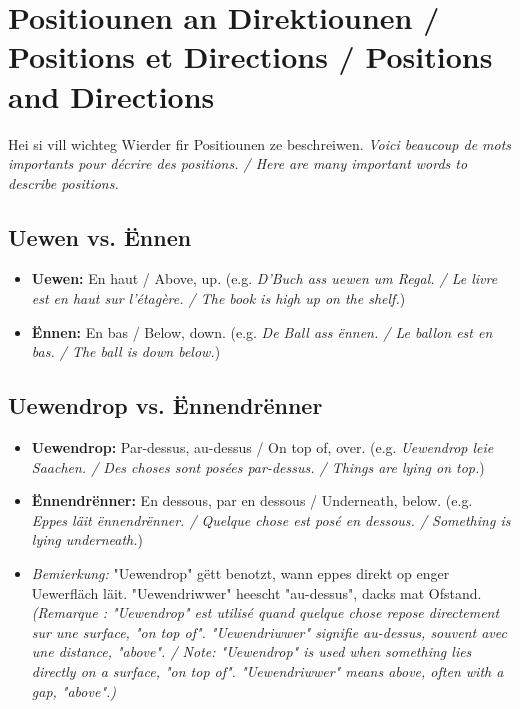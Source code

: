 \vspace{1cm}

\section{Positiounen an Direktiounen / Positions et Directions / Positions and Directions}

Hei si vill wichteg Wierder fir Positiounen ze beschreiwen. \textit{Voici beaucoup de mots importants pour décrire des positions. / Here are many important words to describe positions.}

\subsection*{Uewen vs. Ënnen}
\begin{itemize}
    \item \textbf{Uewen:} En haut / Above, up. (e.g. \textit{D'Buch ass uewen um Regal. / Le livre est en haut sur l'étagère. / The book is high up on the shelf.})
    \item \textbf{Ënnen:} En bas / Below, down. (e.g. \textit{De Ball ass ënnen. / Le ballon est en bas. / The ball is down below.})
\end{itemize}

\subsection*{Uewendrop vs. Ënnendrënner}
\begin{itemize}
    \item \textbf{Uewendrop:} Par-dessus, au-dessus / On top of, over. (e.g. \textit{Uewendrop leie Saachen. / Des choses sont posées par-dessus. / Things are lying on top.})
    \item \textbf{Ënnendrënner:} En dessous, par en dessous / Underneath, below. (e.g. \textit{Eppes läit ënnendrënner. / Quelque chose est posé en dessous. / Something is lying underneath.})
    \item \textit{Bemierkung:} "Uewendrop" gëtt benotzt, wann eppes direkt op enger Uewerfläch läit. "Uewendriwwer" heescht "au-dessus", dacks mat Ofstand. \textit{(Remarque : "Uewendrop" est utilisé quand quelque chose repose directement sur une surface, "on top of". "Uewendriwwer" signifie au-dessus, souvent avec une distance, "above". / Note: "Uewendrop" is used when something lies directly on a surface, "on top of". "Uewendriwwer" means above, often with a gap, "above".)}
\end{itemize}

